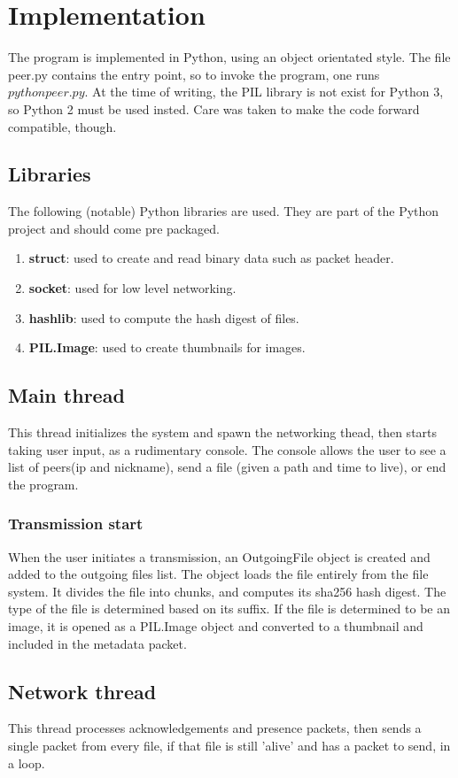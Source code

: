 \documentclass[a4paper, 12pt]{report}
\begin{document}
\section{Implementation}
The program is implemented in Python, using an object orientated style. The file peer.py contains the entry point, so to invoke the program, one runs ${python peer.py}$. At the time of writing, the PIL library is not exist for Python 3, so Python 2 must be used insted. Care was taken to make the code forward compatible, though.

\subsection{Libraries}
The following (notable) Python libraries are used. They are part of the Python project and should come pre packaged.
\begin{enumerate}
\item \textbf{struct}: used to create and read binary data such as packet header.
\item \textbf{socket}: used for low level networking.
\item \textbf{hashlib}: used to compute the hash digest of files.
\item \textbf{PIL.Image}: used to create thumbnails for images.
\end{enumerate}

\subsection{Main thread}
This thread initializes the system and spawn the networking thead, then starts taking user input, as a rudimentary console. The console allows the user to see a list of peers(ip and nickname), send a file (given a path and time to live), or end the program.

\subsubsection{Transmission start}
When the user initiates a transmission, an OutgoingFile object is created and added to the outgoing files list. The object loads the file entirely from the file system. It divides the file into chunks, and computes its sha256 hash digest. The type of the file is determined based on its suffix. If the file is determined to be an image, it is opened as a PIL.Image object and converted to a thumbnail and included in the metadata packet.

\subsection{Network thread}
This thread processes acknowledgements and presence packets, then sends a single packet from every file, if that file is still 'alive' and has a packet to send, in a loop.
\end{document}
